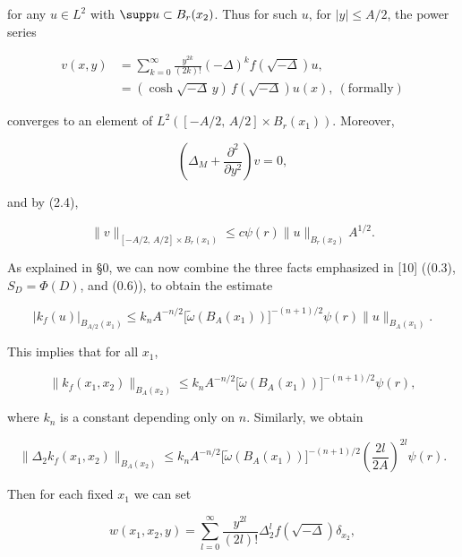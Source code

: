for any $u \in L^2$ with $\supp u \subset B_r(x_2)$. Thus for such $u$, for $|y| \le A/2$, the
power series

\begin{equation}\tag{2.5}
\begin{aligned}
v(x,y) &= \sum_{k=0}^\infty \frac{y^{2k}}{(2k)!}(-\Delta)^k f(\sqrt{-\Delta})u,\\
&= (\cosh \sqrt{-\Delta}\, y)\,f(\sqrt{-\Delta})u(x),\ (\mathrm{formally})
\end{aligned}
\end{equation}

converges to an element of $L^2([ -A/2,\, A/2]\times B_r(x_1))$. Moreover,

\begin{equation}\tag{2.6}
\left(\Delta_M + \frac{\partial^2}{\partial y^2}\right)v = 0,
\end{equation}

and by (2.4),

\begin{equation}\tag{2.7}
\|v\|_{[-A/2,\,A/2]\times B_r(x_1)} \le c\psi(r)\|u\|_{B_r(x_2)}A^{1/2}.
\end{equation}

As explained in \S0, we can now combine the three facts emphasized in [10]
((0.3), $S_D=\Phi(D)$, and (0.6)), to obtain the estimate

\begin{equation}\tag{2.8}
\left|k_f(u)\right|_{B_{A/2}(x_1)}
\le k_nA^{-n/2}\bigl[\tilde{\omega}(B_A(x_1))\bigr]^{-(n+1)/2}\psi(r)\|u\|_{B_A(x_1)}.
\end{equation}

This implies that for all $x_1$,

\begin{equation}\tag{2.9}
\|k_f(x_1,x_2)\|_{B_A(x_2)}
\le k_nA^{-n/2}\bigl[\tilde{\omega}(B_A(x_1))\bigr]^{-(n+1)/2}\psi(r),
\end{equation}

where $k_n$ is a constant depending only on $n$. Similarly, we obtain

\begin{equation}\tag{2.10}
\|\Delta_2 k_f(x_1,x_2)\|_{B_A(x_2)}
\le k_nA^{-n/2}\bigl[\tilde{\omega}(B_A(x_1))\bigr]^{-(n+1)/2}
\left(\frac{2l}{2A}\right)^{2l}\psi(r).
\end{equation}

Then for each fixed $x_1$ we can set

\begin{equation}\tag{2.11}
w(x_1,x_2,y)=\sum_{l=0}^{\infty}\frac{y^{2l}}{(2l)!}\Delta_2^l f(\sqrt{-\Delta})\delta_{x_2},
\end{equation}

